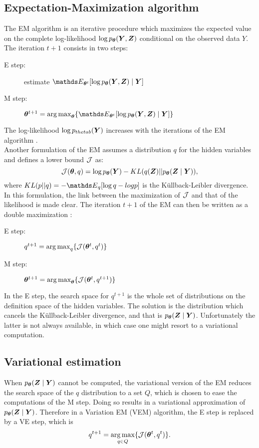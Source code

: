  \subsection{Expectation-Maximization algorithm}
 The EM algorithm is an iterative procedure which maximizes the expected value on  the complete log-likelihood $\log p_{\boldsymbol{\theta}} ({\boldsymbol{Y}}, {\boldsymbol{Z}})$ conditional on the observed data $Y$. The iteration $t+1$ consists in two steps:
 \begin{description}
 \item [E step:] estimate $\Esp_{\thetab^t}[\log p_\thetab (\Ybf, \Zbf)\mid \Ybf]$
 \item [M step:] $\thetab^{t+1} = \argmax_\thetab \{ \Esp_{\thetab^t}[\log p_\thetab (\Ybf, \Zbf)\mid \Ybf]\}$
 \end{description} 
 The  log-likelihood $\log p_{thetab} ({\boldsymbol{Y}})$ increases with the iterations of the EM algorithm \citep{DLR77}. \\
 
 
 Another formulation of the EM assumes a distribution $q$ for the hidden variables \citep{NH98} and defines a  lower bound ${\mathcal{J}}$ as:
 $${\mathcal{J}}({\boldsymbol{\theta}}, q) = \log p_{\boldsymbol{\theta}} ({\boldsymbol{Y}}) - KL(q({\boldsymbol{Z}}) || p_{\boldsymbol{\theta}}({\boldsymbol{Z}}\mid{\boldsymbol{Y}})),$$
 where $KL(p||q) = -\Esp_q[\log q - log p]$ is the Küllback-Leibler divergence. In this formulation, the link between the maximization of ${\mathcal{J}}$ and that of the likelihood is made clear. The iteration $t+1$ of the EM can then be written as a double maximization :
  \begin{description}
 \item [E step:]  $q^{t+1}=\operatorname*{arg\,max}_q \{ {\mathcal{J}}({\boldsymbol{\theta}}^t, q^t)\}$
 \item [M step:] ${\boldsymbol{\theta}}^{t+1} = \operatorname*{arg\,max}_{\boldsymbol{\theta}} \{ {\mathcal{J}}({\boldsymbol{\theta}}^t, q^{t+1})\}$
 \end{description} 
 
In the E step, the search space for $q^{t+1}$ is the whole set of distributions on the definition space of the hidden variables. The solution is the distribution which cancels the Küllback-Leibler divergence, and that is $p_{\boldsymbol{\theta}}({\boldsymbol{Z}}\mid{\boldsymbol{Y}})$. Unfortunately the latter is not always available, in which case one might resort to a variational computation.
 

 \subsection{Variational estimation}
 When $p_{\boldsymbol{\theta}}({\boldsymbol{Z}}\mid{\boldsymbol{Y}})$ cannot be computed, the variational version of the EM reduces the search space of the $q$ distribution to a set $Q$, which is chosen to ease the computations of the M step. Doing so results in a variational approximation of $p_{\boldsymbol{\theta}}({\boldsymbol{Z}}\mid{\boldsymbol{Y}})$. Therefore in a  Variation EM (VEM) algorithm, the E step is replaced by a VE step, which is  
 $$q^{t+1}=\operatorname*{arg\,max}_{q\in Q} \{ {\mathcal{J}}({\boldsymbol{\theta}}^t, q^t)\}.$$
 

